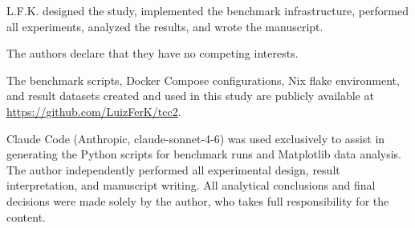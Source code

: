 \documentclass[english]{presets/sbcreviews-2025}%
\begin{document}







\begin{declarations}

\begin{contributions}
L.F.K. designed the study, implemented the benchmark infrastructure, performed all experiments,
analyzed the results, and wrote the manuscript.
\end{contributions}

\begin{interests}
The authors declare that they have no competing interests.
\end{interests}

\begin{materials}
The benchmark scripts, Docker Compose configurations, Nix flake environment, and result datasets
created and used in this study are publicly available at
\url{https://github.com/LuizFerK/tcc2}.
\end{materials}

\begin{aitools}
Claude Code (Anthropic, claude-sonnet-4-6) was used exclusively to assist in generating the Python scripts for benchmark runs and Matplotlib data analysis. The author independently performed all experimental design, result interpretation, and manuscript writing. All analytical conclusions and final decisions were made solely by the author, who takes full responsibility for the content.
\end{aitools}

\end{declarations}



\end{document}
